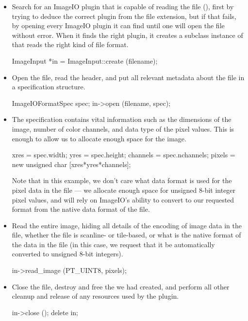 \begin{itemize}
\item Search for an ImageIO plugin that is capable of reading the file
  (), first by trying to deduce the correct plugin from the
  file extension, but if that fails, by opening every ImageIO plugin it
  can find until one will open the file without error.  When it finds
  the right plugin, it creates a subclass instance of \ImageInput that
  reads the right kind of file format.
  \begin{code}
    ImageInput *in = ImageInput::create (filename);
  \end{code}
\item Open the file, read the header, and put all relevant metadata
  about the file in a specification structure.
  \begin{code}
    ImageIOFormatSpec spec;
    in->open (filename, spec);
  \end{code}
\item The specification contains vital information such as the
  dimensions of the image, number of color channels, and data type of
  the pixel values.  This is enough to allow us to allocate enough space
  for the image.
  \begin{code}
    xres = spec.width;
    yres = spec.height;
    channels = spec.nchannels;
    pixels = new unsigned char [xres*yres*channels];
  \end{code}
  Note that in this example, we don't care what data format is used for
  the pixel data in the file --- we allocate enough space for unsigned
  8-bit integer pixel values, and will rely on ImageIO's ability to
  convert to our requested format from the native data format of the
  file.
\item Read the entire image, hiding all details of the encoding of image
  data in the file, whether the file is scanline- or tile-based, or what
  is the native format of the data in the file (in this case, we request
  that it be automatically converted to unsigned 8-bit integers).
  \begin{code}
    in->read_image (PT_UINT8, pixels);
  \end{code}
\item Close the file, destroy and free the \ImageInput we had created,
  and perform all other cleanup and release of any resources used by
  the plugin.
  \begin{code}
    in->close ();
    delete in;
  \end{code}
\end{itemize}



